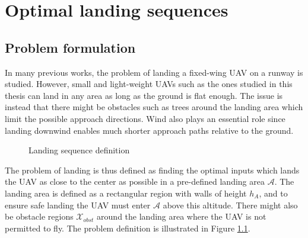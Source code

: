 \chapter{Optimal landing sequences}\label{cha:landing}
\section{Problem formulation}
In many previous works, the problem of landing a fixed-wing UAV on a runway is studied. However, small and light-weight UAVs such as the ones studied 
in this thesis can land in any area as long as the ground is flat enough. The issue is instead that there might be obstacles such as trees around the landing area which limit the possible 
approach directions. Wind also plays an essential role since landing downwind enables much shorter approach paths relative to the ground.

\begin{figure}
    \begin{center}
    \end{center}
    \caption{Landing sequence definition}
    \label{fig:land}          
\end{figure}

The problem of landing is thus defined as finding the optimal inputs which lands the UAV as close to the center as possible in a pre-defined landing area $\mathcal{A}$. The landing area is 
defined as a rectangular region with walls of height $h_A$, and to ensure safe landing the UAV must enter $\mathcal{A}$ above this altitude. 
There might also be obstacle regions $\mathcal{X}_{obst}$ around the landing area where the UAV is not permitted to fly. The problem definition is illustrated in Figure \ref{fig:land}.

